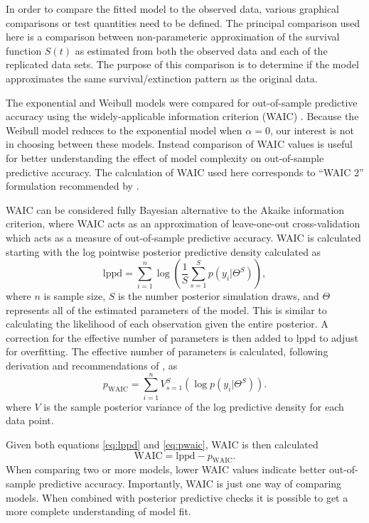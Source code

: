 \documentclass[12pt,letterpaper]{article}
\begin{document}
In order to compare the fitted model to the observed data, various graphical comparisons or test quantities need to be defined. The principal comparison used here is a comparison between non-parameteric approximation of the survival function \(S(t)\) as estimated from both the observed data and each of the replicated data sets. The purpose of this comparison is to determine if the model approximates the same survival/extinction pattern as the original data. 


The exponential and Weibull models were compared for out-of-sample predictive accuracy using the widely-applicable information criterion (WAIC) \citep{Watanabe2010a}. Because the Weibull model reduces to the exponential model when \(\alpha = 0\), our interest is not in choosing between these models. Instead comparison of WAIC values is useful for better understanding the effect of model complexity on out-of-sample predictive accuracy. The calculation of WAIC used here corresponds to ``WAIC 2'' formulation recommended by \citet{Gelman2013d}.

WAIC can be considered fully Bayesian alternative to the Akaike information criterion, where WAIC acts as an approximation of leave-one-out cross-validation which acts as a measure of out-of-sample predictive accuracy. WAIC is calculated starting with the log pointwise posterior predictive density calculated as
\begin{equation}
  \mathrm{lppd} = \sum_{i = 1}^{n} \log \left(\frac{1}{S} \sum_{s = 1}^{S} p(y_{i}|\Theta^{S})\right),
  \label{eq:lppd}
\end{equation}
where \(n\) is sample size, \(S\) is the number posterior simulation draws, and \(\Theta\) represents all of the estimated parameters of the model. This is similar to calculating the likelihood of each observation given the entire posterior. A correction for the effective number of parameters is then added to lppd to adjust for overfitting. The effective number of parameters is calculated, following derivation and recommendations of \citep{Gelman2013d}, as
\begin{equation}
  p_{\mathrm{WAIC}} = \sum_{i = 1}^{n} V_{s = 1}^{S} (\log p(y_{i}|\Theta^{S})).
  \label{eq:pwaic}
\end{equation}
where \(V\) is the sample posterior variance of the log predictive density for each data point.

Given both equations \ref{eq:lppd} and \ref{eq:pwaic}, WAIC is then calculated
\begin{equation}
  \mathrm{WAIC} = \mathrm{lppd} - p_{\mathrm{WAIC}}.
  \label{eq:waic}
\end{equation}
When comparing two or more models, lower WAIC values indicate better out-of-sample predictive accuracy. Importantly, WAIC is just one way of comparing models. When combined with posterior predictive checks it is possible to get a more complete understanding of model fit.
\end{document}
